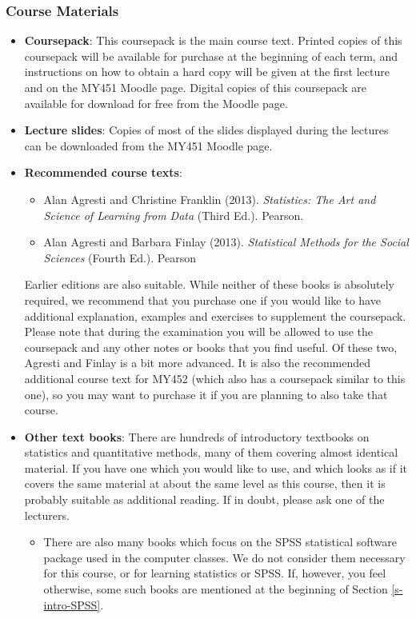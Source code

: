 \documentclass[11pt,a4paper,openany]{book}
\providecommand{\tightlist}{%
  \setlength{\itemsep}{0pt}\setlength{\parskip}{0pt}}
\begin{document}
\subsubsection*{Course Materials}\label{course-materials}

\begin{itemize}
\item
  \textbf{Coursepack}: This coursepack is the main course text. Printed
  copies of this coursepack will be available for purchase at the
  beginning of each term, and instructions on how to obtain a hard copy
  will be given at the first lecture and on the MY451 Moodle page.
  Digital copies of this coursepack are available for download for free
  from the Moodle page.
\item
  \textbf{Lecture slides}: Copies of most of the slides displayed during
  the lectures can be downloaded from the MY451 Moodle page.
\item
  \textbf{Recommended course texts}:

  \begin{itemize}
  \item
    Alan Agresti and Christine Franklin (2013). \emph{Statistics: The
    Art and Science of Learning from Data} (Third Ed.). Pearson.
  \item
    Alan Agresti and Barbara Finlay (2013). \emph{Statistical Methods
    for the Social Sciences} (Fourth Ed.). Pearson
  \end{itemize}

  Earlier editions are also suitable. While neither of these books is
  absolutely required, we recommend that you purchase one if you would
  like to have additional explanation, examples and exercises to
  supplement the coursepack. Please note that during the examination you
  will be allowed to use the coursepack and any other notes or books
  that you find useful. Of these two, Agresti and Finlay is a bit more
  advanced. It is also the recommended additional course text for MY452
  (which also has a coursepack similar to this one), so you may want to
  purchase it if you are planning to also take that course.
\item
  \textbf{Other text books}: There are hundreds of introductory
  textbooks on statistics and quantitative methods, many of them
  covering almost identical material. If you have one which you would
  like to use, and which looks as if it covers the same material at
  about the same level as this course, then it is probably suitable as
  additional reading. If in doubt, please ask one of the lecturers.

  \begin{itemize}
  \tightlist
  \item
    There are also many books which focus on the SPSS statistical
    software package used in the computer classes. We do not consider
    them necessary for this course, or for learning statistics or SPSS.
    If, however, you feel otherwise, some such books are mentioned at
    the beginning of Section \ref{s-intro-SPSS}.
  \end{itemize}
\end{itemize}
\end{document}
